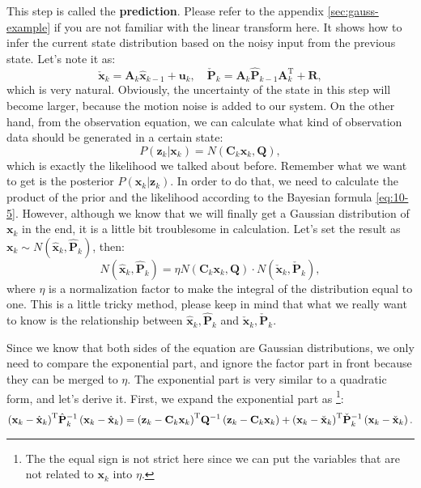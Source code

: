 This step is called the \textbf{prediction}. Please refer to the appendix \ref{sec:gauss-example} if you are not familiar with the linear transform here. It shows how to infer the current state distribution based on the noisy input from the previous state. Let's note it as:
\begin{equation}
	\check{\mathbf{x}}_k = {\mathbf{A}_k {{\hat{\mathbf{x}}}_{k - 1}} + {\mathbf{u}_k}}, \quad \check{\mathbf{P}}_k = {\mathbf{A}_k \hat{\mathbf{P}}_{k-1} { \mathbf{A}^\mathrm{T}_k} + \mathbf{R}},
\end{equation}
which is very natural. Obviously, the uncertainty of the state in this step will become larger, because the motion noise is added to our system. On the other hand, from the observation equation, we can calculate what kind of observation data should be generated in a certain state:
\begin{equation}
	P\left( {{\mathbf{z}_k}|{\mathbf{x}_k}} \right) = N\left( {{\mathbf{C}_k}{\mathbf{x}_k},\mathbf{Q}} \right) ,
\end{equation}
which is exactly the likelihood we talked about before. Remember what we want to get is the posterior $P\left( {{\mathbf{x}_k}|{\mathbf{z}_k}} \right) $. In order to do that, we need to calculate the product of the prior and the likelihood according to the Bayesian formula \eqref{eq:10-5}. However, although we know that we will finally get a Gaussian distribution of $\mathbf{x}_k$ in the end, it is a little bit troublesome in calculation. Let's set the result as $\mathbf{x}_k \sim N(\mathbf{\hat{x}}_k, \mathbf{\hat{P}}_k )$, then:
\begin{equation}
	N(\mathbf{\hat{x}}_k, \mathbf{\hat{P}}_k ) = \eta N\left( {{\mathbf{C}_k}{\mathbf{x}_k},\mathbf{Q}} \right) \cdot N( \mathbf{\check{x}}_k, \mathbf{\check{P}}_k),
\end{equation}
where $\eta$ is a normalization factor to make the integral of the distribution equal to one. This is a little tricky method, please keep in mind that what we really want to know is the relationship between $\hat{\mathbf{x}}_k, \hat{\mathbf{P}}_k$ and $\check{\mathbf{x}}_k, \check{\mathbf{P}}_k$. 

Since we know that both sides of the equation are Gaussian distributions, we only need to compare the exponential part, and ignore the factor part in front because they can be merged to $\eta$. The exponential part is very similar to a quadratic form, and let's derive it. First, we expand the exponential part as \footnote{ The the equal sign is not strict here since we can put the variables that are not related to $\mathbf{x}_k$ into $\eta$. }:
\begin{equation}
	\small
	{\left( {{\mathbf{x}_k} - {{\hat{\mathbf{x}}}_k}} \right)^\mathrm{T}}\hat{\mathbf{P}}_k^{ - 1}\left( {{\mathbf{x}_k} - {{\hat{\mathbf{x}}}_k}} \right) = {\left( {{\mathbf{z}_k} - {\mathbf{C}_k} {\mathbf{x}_k}} \right)^\mathrm{T}}{\mathbf{Q}^{ - 1}}\left( {{\mathbf{z}_k} - {\mathbf{C}_k}{\mathbf{x}_k}} \right) + {\left( {{\mathbf{x}_k} - {{\check{\mathbf{x}}}_k}} \right)^\mathrm{T}}\check{\mathbf{P}}_k^{ - 1}\left( {\mathbf{x}_k - {{\check{\mathbf{x}}}_k}} \right).
\end{equation}

